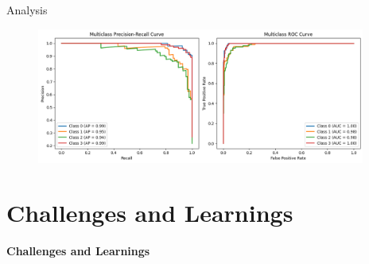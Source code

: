 \documentclass[14pt, aspectratio=169]{beamer}
\begin{document}
\begin{frame}[allowframebreaks]{Analysis}
\begin{adjustwidth}{-0.3cm}{0cm}
\begin{figure}[H]
  \centering
  \includegraphics[height=12em]{../report/ra_pr_XG.png}
  \label{ra_pr_XG}
\end{figure}
\end{adjustwidth}

\end{frame}

\section{Challenges and Learnings}

\begin{frame}{}
  \Huge
  \centering
  \textbf{Challenges and Learnings}
  \normalsize
\end{frame}
\end{document}
